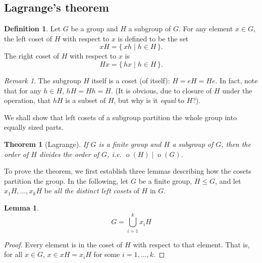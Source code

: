 \documentclass[svgnames]{article}
\newtheorem{Theorem}{Theorem}[section]
\newtheorem{Lemma}[Lemma]{Lemma}
\theoremstyle{definition}
\newtheorem{Definition}[Definition]{Definition}
\theoremstyle{remark}
\newtheorem*{Remark*}{Remark}
\DeclareMathOperator{\ord}{o}
\newcommand{\newterm}[1]{{\color{alertcolor} #1}}
\begin{document}
\subsection{Lagrange's theorem}\label{subsec:Lagrange}
\begin{Definition}\label{def:Cosets}
Let $G$ be a group and $H$ a subgroup of $G$. For any element $x \in G$, the \newterm{left coset} of $H$ with respect to $x$ is defined to be the set
\begin{equation*}
xH = \{\, xh \mid h \in H  \,\}.
\end{equation*}
The \newterm{right coset} of $H$ with respect to $x$ is
\begin{equation*}
Hx = \{\, hx \mid h \in H \,\}.
\end{equation*}
\end{Definition}

\begin{Remark*}
The subgroup $H$ itself is a coset (of itself): $H = eH = He$. In fact, note that for any $h \in H$, $hH = Hh = H$. (It is obvious, due to closure of $H$ under the operation, that $hH$ is a subset of $H$, but why is it \textit{equal} to $H$?).
\end{Remark*}

We shall show that left cosets of a subgroup partition the whole group into equally sized parts.

\begin{Theorem}[Lagrange]\label{thm:Lagrange}
If $G$ is a finite group and $H$ a subgroup of $G$, then the order of $H$ divides the order of $G$, i.e. $\ord(H) \mid \ord(G)$.
\end{Theorem}

To prove the theorem, we first establish three lemmas describing how the cosets partition the group. In the following, let $G$ be a finite group, $H \le G$, and let $x_1 H, \ldots, x_kH$ be \emph{all the distinct left cosets} of $H$ in $G$.

\begin{Lemma}\label{lem:CosetUnion}
\begin{equation*}
G = \bigcup_{i = 1}^k x_i H
\end{equation*}
\end{Lemma}

\begin{proof}
Every element is in the coset of $H$ with respect to that element. That is, for all $x \in G$, $x \in xH = x_i H$ for some $i = 1, \ldots, k$.
\end{proof}
\end{document}
